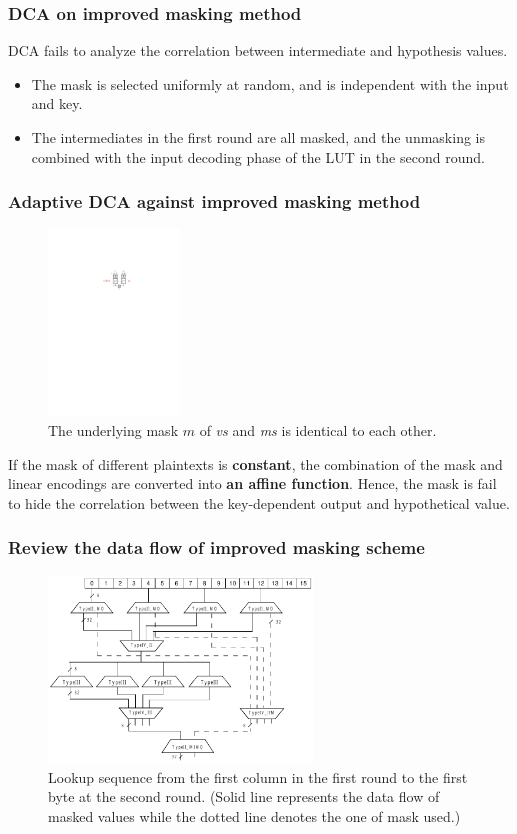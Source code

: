 \documentclass{beamer}
\begin{document}
\frame
{
	\frametitle{DCA on improved masking method}
	DCA fails to analyze the correlation between intermediate and hypothesis values.
	\begin{itemize}
		\item The mask is selected uniformly at random, and is independent with the input and key.
		\item The intermediates in the first round are all masked, and the unmasking is combined with the input decoding phase of the LUT in the second round.
	\end{itemize}
}

\frame
{
	\frametitle{Adaptive DCA against improved masking method}
	\begin{figure}
		\centering
		\includegraphics[width=3.5cm]{./pics/IIMIMO1.pdf}
		\caption{The underlying mask $m$ of \textit{vs} and \textit{ms} is identical to each other.}
	\end{figure}
	
	If the mask of different plaintexts is \textbf{constant}, the combination of the mask and linear encodings are converted into \textbf{an affine function}. Hence, the mask is fail to hide the correlation between the key-dependent output and  hypothetical value.
}


\frame
{
	\frametitle{Review the data flow of improved masking scheme}
	\begin{figure}
		\centering
		\includegraphics[width=7cm]{./pics/DCA_R12.pdf}
		\caption{Lookup sequence from the first column in the first round to the first byte at the second round. (Solid line represents the data flow of masked values while the dotted line denotes the one of mask used.)}
	\end{figure}
}
\end{document}
